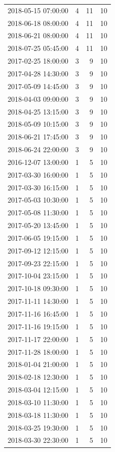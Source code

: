 \begin{tabular}{lrrr}
2018-05-15 07:00:00 & 4 & 11 & 10 \\
2018-06-18 08:00:00 & 4 & 11 & 10 \\
2018-06-21 08:00:00 & 4 & 11 & 10 \\
2018-07-25 05:45:00 & 4 & 11 & 10 \\
2017-02-25 18:00:00 & 3 & 9 & 10 \\
2017-04-28 14:30:00 & 3 & 9 & 10 \\
2017-05-09 14:45:00 & 3 & 9 & 10 \\
2018-04-03 09:00:00 & 3 & 9 & 10 \\
2018-04-25 13:15:00 & 3 & 9 & 10 \\
2018-05-09 10:15:00 & 3 & 9 & 10 \\
2018-06-21 17:45:00 & 3 & 9 & 10 \\
2018-06-24 22:00:00 & 3 & 9 & 10 \\
2016-12-07 13:00:00 & 1 & 5 & 10 \\
2017-03-30 16:00:00 & 1 & 5 & 10 \\
2017-03-30 16:15:00 & 1 & 5 & 10 \\
2017-05-03 10:30:00 & 1 & 5 & 10 \\
2017-05-08 11:30:00 & 1 & 5 & 10 \\
2017-05-20 13:45:00 & 1 & 5 & 10 \\
2017-06-05 19:15:00 & 1 & 5 & 10 \\
2017-09-12 12:15:00 & 1 & 5 & 10 \\
2017-09-23 22:15:00 & 1 & 5 & 10 \\
2017-10-04 23:15:00 & 1 & 5 & 10 \\
2017-10-18 09:30:00 & 1 & 5 & 10 \\
2017-11-11 14:30:00 & 1 & 5 & 10 \\
2017-11-16 16:45:00 & 1 & 5 & 10 \\
2017-11-16 19:15:00 & 1 & 5 & 10 \\
2017-11-17 22:00:00 & 1 & 5 & 10 \\
2017-11-28 18:00:00 & 1 & 5 & 10 \\
2018-01-04 21:00:00 & 1 & 5 & 10 \\
2018-02-18 12:30:00 & 1 & 5 & 10 \\
2018-03-04 12:15:00 & 1 & 5 & 10 \\
2018-03-10 11:30:00 & 1 & 5 & 10 \\
2018-03-18 11:30:00 & 1 & 5 & 10 \\
2018-03-25 19:30:00 & 1 & 5 & 10 \\
2018-03-30 22:30:00 & 1 & 5 & 10 \\

\end{tabular}
